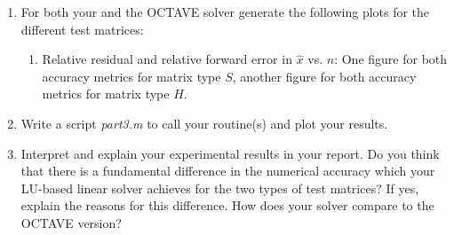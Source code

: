 \documentclass{scrartcl}
\begin{document}
\begin{enumerate}
\begin{enumerate}
        \end{enumerate}

        \item For both your and the OCTAVE solver generate the following plots for the different test matrices:
            \begin{enumerate}
            \item Relative residual and relative forward error in $\hat{x}$ vs. $n$: One figure for both accuracy metrics for matrix type $S$, another figure for both accuracy metrics for matrix type $H$.
            \end{enumerate}

        \item Write a script \textit{part3.m} to call your routine(s) and plot your results. 
            
        \item Interpret and explain your experimental results in your report. Do you think that there is a fundamental difference in the numerical accuracy which your LU-based linear solver achieves for the two types of test matrices? If yes, explain the reasons for this difference. How does your solver compare to the OCTAVE version?
    \end{enumerate}
\end{document}
